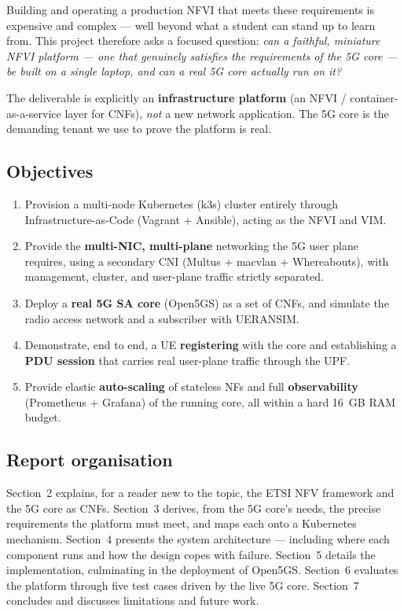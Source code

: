 Building and operating a production NFVI that meets these requirements is
expensive and complex --- well beyond what a student can stand up to learn
from. This project therefore asks a focused question:
\emph{can a faithful, miniature NFVI platform --- one that genuinely satisfies
the requirements of the 5G core --- be built on a single laptop, and can a
real 5G core actually run on it?}

The deliverable is explicitly an \textbf{infrastructure platform} (an NFVI /
container-as-a-service layer for CNFs), \emph{not} a new network application.
The 5G core is the demanding tenant we use to prove the platform is real.

\subsection{Objectives}

\begin{enumerate}
    \item Provision a multi-node Kubernetes (k3s) cluster entirely through
          Infrastructure-as-Code (Vagrant + Ansible), acting as the NFVI and
          VIM.
    \item Provide the \textbf{multi-NIC, multi-plane} networking the 5G
          user plane requires, using a secondary CNI
          (Multus + macvlan + Whereabouts), with management, cluster, and
          user-plane traffic strictly separated.
    \item Deploy a \textbf{real 5G SA core} (Open5GS) as a set of CNFs, and
          simulate the radio access network and a subscriber with UERANSIM.
    \item Demonstrate, end to end, a UE \textbf{registering} with the core and
          establishing a \textbf{PDU session} that carries real user-plane
          traffic through the UPF.
    \item Provide elastic \textbf{auto-scaling} of stateless NFs and full
          \textbf{observability} (Prometheus + Grafana) of the running core,
          all within a hard 16~GB RAM budget.
\end{enumerate}

\subsection{Report organisation}

Section~2 explains, for a reader new to the topic, the ETSI NFV framework and
the 5G core as CNFs. Section~3 derives, from the 5G core's needs, the precise
requirements the platform must meet, and maps each onto a Kubernetes mechanism.
Section~4 presents the system architecture --- including where each component
runs and how the design copes with failure. Section~5 details the
implementation, culminating in the deployment of Open5GS. Section~6 evaluates
the platform through five test cases driven by the live 5G core. Section~7
concludes and discusses limitations and future work.
